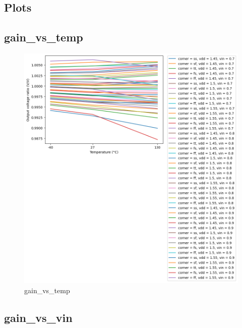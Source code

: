 \documentclass[
  a4paper,
  DIV=11,
  numbers=noendperiod]{scrartcl}
\begin{document}
\begin{tcolorbox}
\subsection{Plots}\label{plots}

\subsection{gain\_vs\_temp}\label{gain_vs_temp}

\begin{figure}[H]

{\centering \includegraphics{./cace/_docs/ota-5t/schematic/gain_vs_temp.png}

}

\caption{gain\_vs\_temp}

\end{figure}%

\subsection{gain\_vs\_vin}\label{gain_vs_vin}

\begin{figure}[H]


\end{figure}
\end{tcolorbox}
\end{document}
